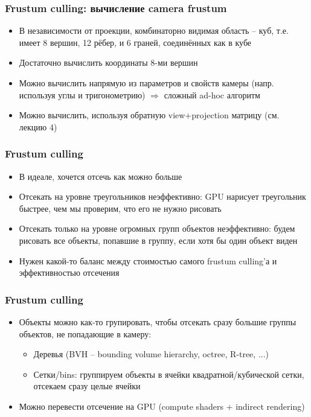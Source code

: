 \documentclass{beamer}
\begin{document}
\begin{frame}[fragile]
\frametitle{Frustum culling: вычисление camera frustum}
\begin{itemize}
\item В независимости от проекции, комбинаторно видимая область -- куб, т.е. имеет 8 вершин, 12 рёбер, и 6 граней, соединённых как в кубе
\pause
\item Достаточно вычислить координаты 8-ми вершин
\pause
\item Можно вычислить напрямую из параметров и свойств камеры (напр. используя углы и тригонометрию) \begin{math}\Longrightarrow\end{math} сложный ad-hoc алгоритм
\pause
\item Можно вычислить, используя обратную view+projection матрицу (см. лекцию 4)
\end{itemize}
\end{frame}

\begin{frame}[fragile]
\frametitle{Frustum culling}
\begin{itemize}
\item В идеале, хочется отсечь как можно больше
\pause
\item Отсекать на уровне треугольников неэффективно: GPU нарисует треугольник быстрее, чем мы проверим, что его не нужно рисовать
\pause
\item Отсекать только на уровне огромных групп объектов неэффективно: будем рисовать все объекты, попавшие в группу, если хотя бы один объект виден
\pause
\item Нужен какой-то баланс между стоимостью самого frustum culling'а и эффективностью отсечения
\end{itemize}
\end{frame}

\begin{frame}[fragile]
\frametitle{Frustum culling}
\begin{itemize}
\item Объекты можно как-то групировать, чтобы отсекать сразу большие группы объектов, не попадающие в камеру:
\pause
\begin{itemize}
\item Деревья (BVH -- bounding volume hierarchy, octree, R-tree, ...)
\pause
\item Сетки/bins: группируем объекты в ячейки квадратной/кубической сетки, отсекаем сразу целые ячейки
\end{itemize}
\pause
\item Можно перевести отсечение на GPU (compute shaders + indirect rendering)
\end{itemize}
\end{frame}
\end{document}

